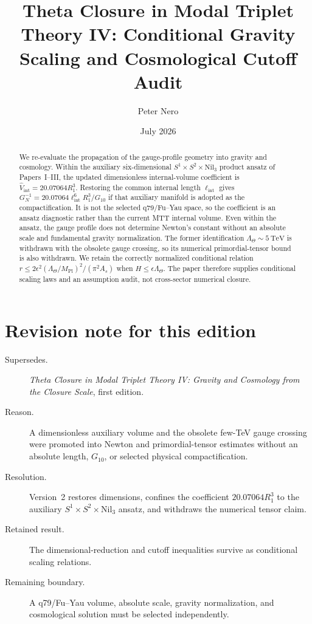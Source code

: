 \documentclass[11pt]{article}
\title{Theta Closure in Modal Triplet Theory IV:
Conditional Gravity Scaling and Cosmological Cutoff Audit}
\author{Peter Nero}
\date{July 2026}
\begin{document}
\maketitle

\begin{abstract}
We re-evaluate the propagation of the gauge-profile geometry into gravity and
cosmology. Within the auxiliary six-dimensional
$S^1\times S^2\times\mathrm{Nil}_3$ product ansatz of Papers~I--III, the
updated dimensionless internal-volume coefficient is
$\widehat V_{\mathrm{int}}=20.07064R_1^3$. Restoring the common internal length
$\ell_{\mathrm{int}}$ gives
$G_N^{-1}=20.07064\ell_{\mathrm{int}}^6R_1^3/G_{10}$ if that auxiliary
manifold is adopted as the compactification. It is not the selected q79/Fu--Yau
space, so the coefficient is an ansatz diagnostic rather than the current MTT
internal volume. Even within the ansatz, the gauge profile does not determine
Newton's constant without an absolute scale and fundamental gravity
normalization. The former identification
$\Lambda_\Theta\sim5~\mathrm{TeV}$ is withdrawn with the obsolete gauge
crossing, so its numerical primordial-tensor bound is also withdrawn. We retain
the correctly normalized conditional relation
$r\leq 2\epsilon^2(\Lambda_\Theta/M_{\mathrm{Pl}})^2/(\pi^2A_s)$ when
$H\leq\epsilon\Lambda_\Theta$. The paper therefore supplies conditional
scaling laws and an assumption audit, not cross-sector numerical closure.
\end{abstract}

\section*{Revision note for this edition}
\begin{description}
\item[Supersedes.] \emph{Theta Closure in Modal Triplet Theory IV: Gravity
and Cosmology from the Closure Scale}, first edition.
\item[Reason.] A dimensionless auxiliary volume and the obsolete few-TeV gauge
crossing were promoted into Newton and primordial-tensor estimates without an
absolute length, $G_{10}$, or selected physical compactification.
\item[Resolution.] Version~2 restores dimensions, confines the coefficient
$20.07064R_1^3$ to the auxiliary $S^1\times S^2\times\mathrm{Nil}_3$ ansatz,
and withdraws the numerical tensor claim.
\item[Retained result.] The dimensional-reduction and cutoff inequalities
survive as conditional scaling relations.
\item[Remaining boundary.] A q79/Fu--Yau volume, absolute scale, gravity
normalization, and cosmological solution must be selected independently.
\end{description}
\end{document}
